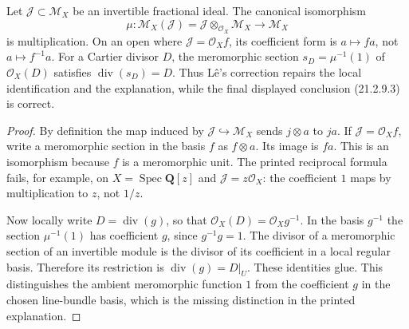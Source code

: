\begin{proposition}\label{SA23-D-15}
Let $\mathcal J\subset\mathcal M_X$ be an invertible
fractional ideal.  The canonical isomorphism
\[
 \mu:\mathcal M_X(\mathcal J)
 =\mathcal J\otimes_{\mathcal O_X}\mathcal M_X
 \longrightarrow\mathcal M_X
\]
is multiplication.  On an open where
$\mathcal J=\mathcal O_X f$, its coefficient form is
$a\mapsto fa$, not $a\mapsto f^{-1}a$.
For a Cartier divisor $D$, the meromorphic section
$s_D=\mu^{-1}(1)$ of $\mathcal O_X(D)$ satisfies
$\operatorname{div}(s_D)=D$.
Thus L\^e's correction repairs the local identification
and the explanation, while the final displayed conclusion
(21.2.9.3) is correct.
\end{proposition}
\begin{proof}
By definition the map induced by
$\mathcal J\hookrightarrow\mathcal M_X$ sends
$j\otimes a$ to $ja$.
If $\mathcal J=\mathcal O_X f$, write a meromorphic
section in the basis $f$ as $f\otimes a$.
Its image is $fa$.  This is an isomorphism because
$f$ is a meromorphic unit.
The printed reciprocal formula fails, for example, on
$X=\operatorname{Spec}\mathbf Q[z]$ and
$\mathcal J=z\mathcal O_X$: the coefficient $1$
maps by multiplication to $z$, not $1/z$.

Now locally write $D=\operatorname{div}(g)$, so that
$\mathcal O_X(D)=\mathcal O_Xg^{-1}$.
In the basis $g^{-1}$ the section $\mu^{-1}(1)$
has coefficient $g$, since $g^{-1}g=1$.
The divisor of a meromorphic section of an invertible
module is the divisor of its coefficient in a local
regular basis.  Therefore its restriction is
$\operatorname{div}(g)=D|_U$.  These identities glue.
This distinguishes the ambient meromorphic function $1$
from the coefficient $g$ in the chosen line-bundle basis,
which is the missing distinction in the printed explanation.
\end{proof}

